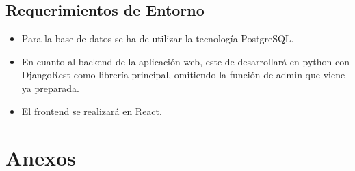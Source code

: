 \documentclass{report}
\begin{document}
        \vspace{1cm}

        \subsection*{Requerimientos de Entorno}
            \begin{itemize}
                \item Para la base de datos se ha de utilizar la tecnología PostgreSQL.
                \item En cuanto al backend de la aplicación web, este de desarrollará en python con DjangoRest como 
                librería principal, omitiendo la función de admin que viene ya preparada.
                \item El frontend se realizará en React.
            \end{itemize}

    \newpage

    \section*{Anexos}
\end{document}
